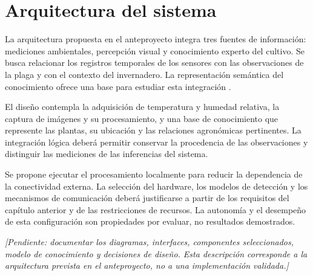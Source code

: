 \chapter{Arquitectura del sistema}
\label{cap:arquitectura}

La arquitectura propuesta en el anteproyecto integra tres fuentes de información:
mediciones ambientales, percepción visual y conocimiento experto del cultivo.
Se busca relacionar los registros temporales de los sensores con las observaciones
de la plaga y con el contexto del invernadero. La representación semántica del
conocimiento ofrece una base para estudiar esta integración
\cite{umar2024ontology}.

El diseño contempla la adquisición de temperatura y humedad relativa, la captura
de imágenes y su procesamiento, y una base de conocimiento que represente las
plantas, su ubicación y las relaciones agronómicas pertinentes. La integración
lógica deberá permitir conservar la procedencia de las observaciones y distinguir
las mediciones de las inferencias del sistema.

Se propone ejecutar el procesamiento localmente para reducir la dependencia de
la conectividad externa. La selección del hardware, los modelos de detección y
los mecanismos de comunicación deberá justificarse a partir de los requisitos
del capítulo anterior y de las restricciones de recursos. La autonomía y el
desempeño de esta configuración son propiedades por evaluar, no resultados
demostrados.

\textit{[Pendiente: documentar los diagramas, interfaces, componentes seleccionados,
modelo de conocimiento y decisiones de diseño. Esta descripción corresponde a
la arquitectura prevista en el anteproyecto, no a una implementación validada.]}
